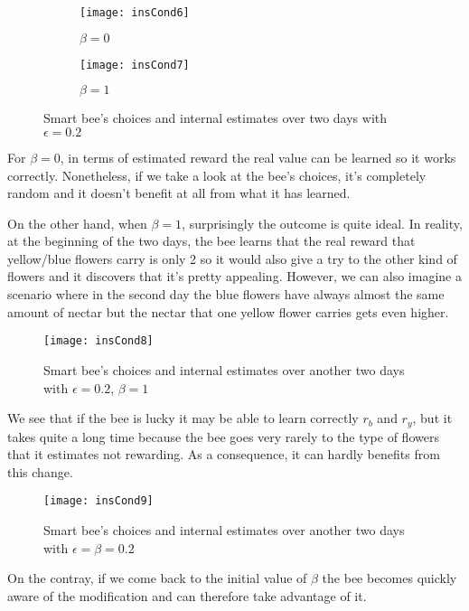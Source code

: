 \begin{figure}[H]
  \centering
  \begin{subfigure}[]{0.45\textwidth}
    \centering
    \texttt{[image: insCond6]}
    \caption{$\beta = 0$}
  \end{subfigure}
  \begin{subfigure}[]{0.45\textwidth}
    \centering
    \texttt{[image: insCond7]}
    \caption{$\beta = 1$}
  \end{subfigure}

  \caption {Smart bee's choices and internal estimates over two days with 
            $\epsilon = 0.2$}
\end{figure}

For $\beta = 0$, in terms of estimated reward the real value can be learned so 
it works correctly. Nonetheless, if we take a look at the bee's choices, it's 
completely random and it doesn't benefit at all from what it has learned.

On the other hand, when $\beta = 1$, surprisingly the outcome is quite ideal. 
In reality, at the beginning of the two days, the bee learns that the real 
reward that yellow/blue flowers carry is only 2 so it would also give a try to
the other kind of flowers and it discovers that it's pretty appealing. 
However, we can also imagine a scenario where in the second day the blue 
flowers have always almost the same amount of nectar but the nectar that one 
yellow flower carries gets even higher.

\begin{figure}[H]
  \centering
  \texttt{[image: insCond8]}
  \caption {Smart bee's choices and internal estimates over another two days 
            with $\epsilon = 0.2$, $\beta = 1$}
\end{figure}

We see that if the bee is lucky it may be able to learn correctly $r_b$ and
$r_y$, but it takes quite a long time because
the bee goes very rarely to the type of flowers that it estimates  not
rewarding. As a consequence, it can hardly benefits from this change.

\begin{figure}[H]
  \centering
  \texttt{[image: insCond9]}
  \caption {Smart bee's choices and internal estimates over another two days 
            with $\epsilon = \beta = 0.2$}
\end{figure}

On the contray, if we come back to the initial value of $\beta$ the bee 
becomes quickly aware of the modification and can therefore take advantage of
it. 

